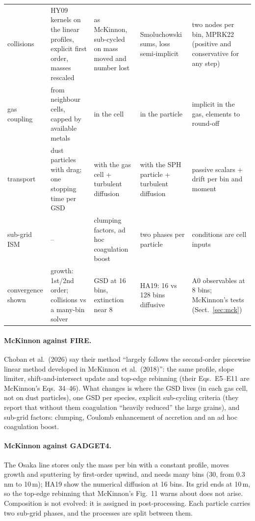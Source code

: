 \documentclass[11pt,a4paper]{article}
\begin{document}
\begin{table}[H]
\begin{tabularx}{\textwidth}{@{}>{\raggedright\arraybackslash}p{2.3cm} L L L L@{}}
collisions & HY09 kernels on the linear profiles, explicit first order, masses rescaled & as McKinnon, sub-cycled on mass moved and number lost & Smoluchowski sums, loss semi-implicit & two nodes per bin, MPRK22 (positive and conservative for any step) \\
gas coupling & from neighbour cells, capped by available metals & in the cell & in the particle & implicit in the gas, elements to round-off \\
transport & dust particles with drag; one stopping time per GSD & with the gas cell + turbulent diffusion & with the SPH particle + turbulent diffusion & passive scalars + drift per bin and moment \\
sub-grid ISM & -- & clumping factors, ad hoc coagulation boost & two phases per particle & conditions are cell inputs \\
convergence shown & growth: 1st/2nd order; collisions vs a many-bin solver & GSD at 16 bins, extinction near 8 & HA19: 16 vs 128 bins diffusive & A0 observables at 8 bins; McKinnon's tests (Sect.~\ref{sec:mck}) \\
\bottomrule
\end{tabularx}
\end{table}

\paragraph{McKinnon against FIRE.} Choban et al.\ (2026) say their method ``largely follows the second-order
piecewise linear method developed in McKinnon et al.\ (2018)'': the same profile, slope limiter, shift-and-intersect
update and top-edge rebinning (their Eqs.~E5--E11 are McKinnon's Eqs.~34--46). What changes is where the GSD lives (in
each gas cell, not on dust particles), one GSD per species, explicit sub-cycling criteria (they report that without
them coagulation ``heavily reduced'' the large grains), and sub-grid factors: clumping, Coulomb enhancement of accretion
and an ad hoc coagulation boost.

\paragraph{McKinnon against GADGET4.} The Osaka line stores only the mass per bin with a constant profile, moves
growth and sputtering by first-order upwind, and needs many bins (30, from 0.3\,nm to 10\,\textmu m); HA19 show the
numerical diffusion at 16 bins. Its grid ends at 10\,\textmu m, so the top-edge rebinning that McKinnon's Fig.~11
warns about does not arise. Composition is not evolved: it is assigned in post-processing. Each particle carries two
sub-grid phases, and the processes are split between them.
\end{document}
